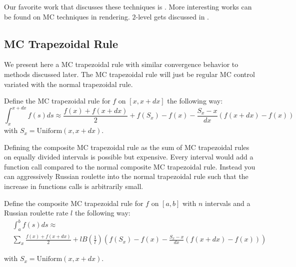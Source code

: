 \documentclass[a4paper,12pt]{article}
\begin{document}
\vspace*{0.2cm}
\begin{pythonn}
\end{pythonn}

\begin{related}
    Our favorite work that discusses these techniques is \cite{veach_robust_nodate}.
    More interesting works can be found on MC techniques in rendering.
    $2$-level gets discussed in \cite{giles_multilevel_2013}.
\end{related}

\subsection{MC Trapezoidal Rule}
We present here a MC trapezoidal rule with similar convergence behavior to
methods discussed later. The MC trapezoidal rule will just be
regular MC control variated with the normal trapezoidal rule.

\begin{definition}
    Define the MC trapezoidal rule for $f$ on $[x,x+dx]$ the following
    way:
    \begin{equation}
        \int_{x}^{x+dx} f(s)ds \approx
        \frac{f(x)+f(x+dx)}{2} + f(S_{x})-f(x)-\frac{S_{x}-x}{dx}(f(x+dx)-f(x))
    \end{equation}
    with $S_{x} = \text{Uniform}(x,x+dx)$.
\end{definition}


Defining the composite MC trapezoidal rule as
the sum of MC trapezoidal rules on equally divided intervals
is possible but expensive. Every interval would add a function call
compared to the normal composite MC trapezoidal rule. Instead
you can aggressively Russian roulette into the normal trapezoidal rule
such that the increase in functions calls is arbitrarily small.

\begin{definition} \label{MCtrap}
    Define the composite MC trapezoidal rule for $f$ on $[a,b]$ with
    $n$ intervals and a Russian roulette rate $l$ the following way:
    \begin{align}
         & \int_{a}^{b} f(s)ds \approx        \\
         & \sum_{x}  \frac{f(x)+f(x+dx)}{2} +
        l B \left(\frac{1}{l} \right)
        \left(f(S_{x})-f(x)-\frac{S_{x}-x}{dx}(f(x+dx)-f(x)) \right)
    \end{align}

    with $S_{x} = \text{Uniform}(x,x+dx)$.

\end{definition}
\end{document}
